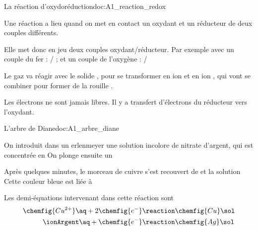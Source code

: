 \begin{doc}{La réaction d'oxydoréduction}{doc:A1_reaction_redox}
  \begin{importants}
    Une réaction  a lieu quand on met en contact un oxydant et un réducteur de deux couples différents.
  \end{importants}
  
  Elle met donc en jeu deux couples oxydant/réducteur.
  Par exemple avec un couple du fer : \ionFerIII/ ; et un couple de l'oxygène : \dioxygene/

  Le gaz \dioxygene va réagir avec le solide , pour se transformer en ion \ionFerIII et en ion , qui vont se combiner pour former de la rouille .

  \begin{importants}
    Les électrons ne sont jamais libres.
    Il y a transfert d'électrons du réducteur vers l'oxydant.
  \end{importants}
\end{doc}


\begin{doc}{L'arbre de Diane}{doc:A1_arbre_diane}
  \begin{wrapfigure}[4]{r}{0.1\linewidth}
    \vspace*{-24pt}
  \end{wrapfigure}

  \moleculesGras
  On introduit dans un erlenmeyer une solution incolore de nitrate d'argent, qui est concentrée en 
  On plonge ensuite un 

  Après quelques minutes, le morceau de cuivre s'est recouvert de  et la solution 
  Cette couleur bleue est liée à 
  \moleculesNormale

  Les demi-équations intervenant dans  cette réaction sont
  \begin{align*}
    \chemfig{Cu^{2+}}\aq + 2\chemfig{e^{-}} &\reaction \chemfig{Cu}\sol \\
    \ionArgent\aq + \chemfig{e^{-}} &\reaction \chemfig{Ag}\sol
  \end{align*}
\end{doc}

